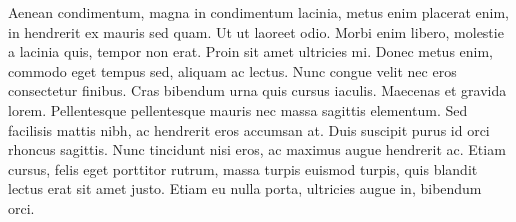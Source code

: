 \documentclass[]{article}
\begin{document}
\begin{landscape}\begin{table}[!h]
\centering{}

\end{table}
\end{landscape}

Aenean condimentum, magna in condimentum lacinia, metus enim placerat
enim, in hendrerit ex mauris sed quam. Ut ut laoreet odio. Morbi enim
libero, molestie a lacinia quis, tempor non erat. Proin sit amet
ultricies mi. Donec metus enim, commodo eget tempus sed, aliquam ac
lectus. Nunc congue velit nec eros consectetur finibus. Cras bibendum
urna quis cursus iaculis. Maecenas et gravida lorem. Pellentesque
pellentesque mauris nec massa sagittis elementum. Sed facilisis mattis
nibh, ac hendrerit eros accumsan at. Duis suscipit purus id orci rhoncus
sagittis. Nunc tincidunt nisi eros, ac maximus augue hendrerit ac. Etiam
cursus, felis eget porttitor rutrum, massa turpis euismod turpis, quis
blandit lectus erat sit amet justo. Etiam eu nulla porta, ultricies
augue in, bibendum orci.
\end{document}
